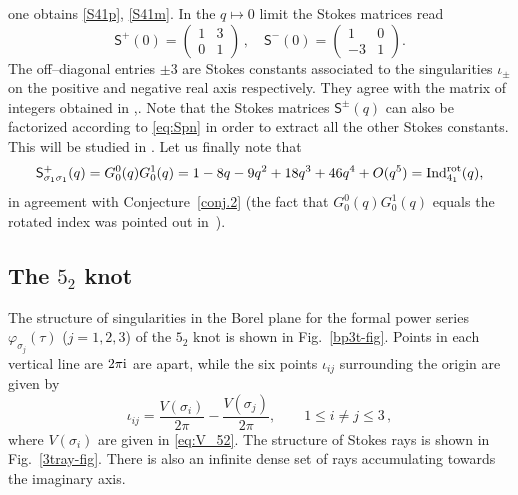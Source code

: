 \documentclass[12pt,reqno]{amsart}
\theoremstyle{definition}
\def\-{\,-\,}
\def\ri{\mathrm{i}}
\def\ri{{\rm i}}
\def\mf{\mathfrak}
\def\ms{\mathsf}
\begin{document}
one obtains \eqref{S41p}, \eqref{S41m}.
In the $q\mapsto 0$ limit the Stokes matrices read
\begin{equation}
  \ms{S}^+(0) =
  \begin{pmatrix}
    1&3\\0&1
  \end{pmatrix}\,,\quad
  \ms{S}^-(0) =
  \begin{pmatrix}
    1&0\\-3&1
  \end{pmatrix}.
\end{equation}
The off--diagonal entries $\pm 3$ are Stokes constants associated to
the singularities $\iota_{\pm}$ on the positive and negative real axis
respectively.  They agree with the matrix of integers obtained in
\cite{gh-res},\cite{GZ:kashaev}. Note that the Stokes matrices
$\ms{S}^{\pm}(q)$ can also be factorized according to \eqref{eq:Spn}
in order to extract all the other Stokes constants.  This will be
studied in \cite{GGM-peacock}. Let us finally note that 
%
\begin{equation}
\mathsf{S}^+_{\sigma_1 \sigma_1}(q)= G_0^0(q) G_0^1  (q)
=1 -8 q -9 q^2 +18 q^3 + 46 q^4+ O(q^5)
= {\rm Ind}^{\rm rot}_{4_1}(q), 
\end{equation}
%
in agreement with Conjecture~\ref{conj.2} (the fact that
$ G_0^0(q) G_0^1 (q)$ equals the rotated index was pointed out
in~\cite{GZ:qseries}).

\subsection{The $5_2$ knot}
\label{sub.asy52}

The structure of singularities in the Borel plane for the formal power
series $\varphi_{\sigma_j}(\tau)$ ($j=1,2,3$) of the $5_2$ knot is
shown in Fig.~\ref{bp3t-fig}.  Points in each vertical line are
$2\pi\ri$ are apart, while the six points $\iota_{ij}$ surrounding the
origin are given by
\begin{equation}
  \iota_{ij} = \frac{V(\sigma_i)}{2\pi} - \frac{V(\sigma_j)}{2\pi},\qquad
  1 \leq i\neq j \leq 3 \,,
\end{equation}
where $V(\sigma_i)$ are given in \eqref{eq:V_52}.  The structure of
Stokes rays is shown in Fig.~\ref{3tray-fig}.  There is also an
infinite dense set of rays accumulating towards the imaginary axis.
\end{document}

